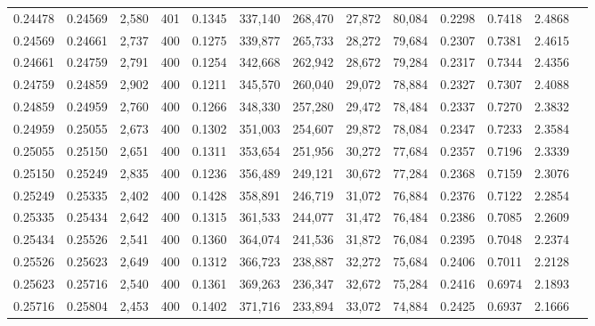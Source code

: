 \begin{tabular}{rrrrrrrrrrrrr}
0.24478 & 0.24569 &  2,580 & 401 &                                     0.1345 & 337,140 & 268,470 &  27,872 &  80,084 & 0.2298 & 0.7418 & 2.4868 \\
0.24569 & 0.24661 &  2,737 & 400 &                                     0.1275 & 339,877 & 265,733 &  28,272 &  79,684 & 0.2307 & 0.7381 & 2.4615 \\
0.24661 & 0.24759 &  2,791 & 400 &                                     0.1254 & 342,668 & 262,942 &  28,672 &  79,284 & 0.2317 & 0.7344 & 2.4356 \\
0.24759 & 0.24859 &  2,902 & 400 &                                     0.1211 & 345,570 & 260,040 &  29,072 &  78,884 & 0.2327 & 0.7307 & 2.4088 \\
0.24859 & 0.24959 &  2,760 & 400 &                                     0.1266 & 348,330 & 257,280 &  29,472 &  78,484 & 0.2337 & 0.7270 & 2.3832 \\
0.24959 & 0.25055 &  2,673 & 400 &                                     0.1302 & 351,003 & 254,607 &  29,872 &  78,084 & 0.2347 & 0.7233 & 2.3584 \\
0.25055 & 0.25150 &  2,651 & 400 &                                     0.1311 & 353,654 & 251,956 &  30,272 &  77,684 & 0.2357 & 0.7196 & 2.3339 \\
0.25150 & 0.25249 &  2,835 & 400 &                                     0.1236 & 356,489 & 249,121 &  30,672 &  77,284 & 0.2368 & 0.7159 & 2.3076 \\
0.25249 & 0.25335 &  2,402 & 400 &                                     0.1428 & 358,891 & 246,719 &  31,072 &  76,884 & 0.2376 & 0.7122 & 2.2854 \\
0.25335 & 0.25434 &  2,642 & 400 &                                     0.1315 & 361,533 & 244,077 &  31,472 &  76,484 & 0.2386 & 0.7085 & 2.2609 \\
0.25434 & 0.25526 &  2,541 & 400 &                                     0.1360 & 364,074 & 241,536 &  31,872 &  76,084 & 0.2395 & 0.7048 & 2.2374 \\
0.25526 & 0.25623 &  2,649 & 400 &                                     0.1312 & 366,723 & 238,887 &  32,272 &  75,684 & 0.2406 & 0.7011 & 2.2128 \\
0.25623 & 0.25716 &  2,540 & 400 &                                     0.1361 & 369,263 & 236,347 &  32,672 &  75,284 & 0.2416 & 0.6974 & 2.1893 \\
0.25716 & 0.25804 &  2,453 & 400 &                                     0.1402 & 371,716 & 233,894 &  33,072 &  74,884 & 0.2425 & 0.6937 & 2.1666 \\

\end{tabular}
